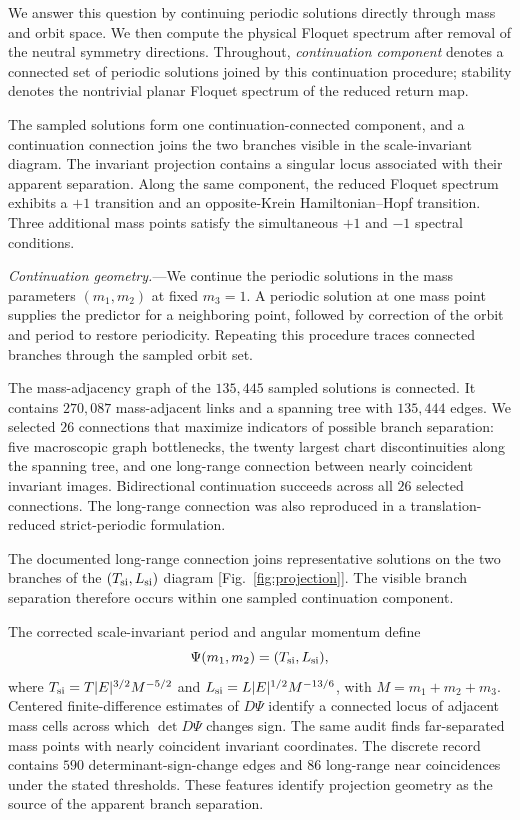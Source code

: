 \documentclass[aps,prl,reprint,amsmath,amssymb]{revtex4-2}
\begin{document}
We answer this question by continuing periodic solutions directly through mass
and orbit space. We then compute the physical Floquet spectrum after removal of
the neutral symmetry directions. Throughout, \emph{continuation component}
denotes a connected set of periodic solutions joined by this continuation
procedure; stability denotes the nontrivial planar Floquet spectrum of the
reduced return map.

The sampled solutions form one continuation-connected component, and a
continuation connection joins the two branches visible in the scale-invariant
diagram. The invariant projection contains a singular locus associated with
their apparent separation. Along the same component, the reduced Floquet
spectrum exhibits a $+1$ transition and an opposite-Krein Hamiltonian--Hopf
transition. Three additional mass points satisfy the simultaneous $+1$ and
$-1$ spectral conditions.



\emph{Continuation geometry.}---We continue the periodic solutions in the mass
parameters $(m_1,m_2)$ at fixed $m_3=1$. A periodic solution at one mass point
supplies the predictor for a neighboring point, followed by correction of the
orbit and period to restore periodicity. Repeating this procedure traces
connected branches through the sampled orbit set.

The mass-adjacency graph of the $135{,}445$ sampled solutions is connected. It
contains $270{,}087$ mass-adjacent links and a spanning tree with $135{,}444$
edges. We selected $26$ connections that maximize indicators of possible
branch separation: five macroscopic graph bottlenecks, the twenty largest chart
discontinuities along the spanning tree, and one long-range connection between
nearly coincident invariant images. Bidirectional continuation succeeds across
all $26$ selected connections. The long-range connection was also reproduced
in a translation-reduced strict-periodic formulation.

The documented long-range connection joins representative solutions on the
two branches of the $(T_{\rm si},L_{\rm si})$ diagram
[Fig.~\ref{fig:projection}]. The visible branch separation therefore occurs
within one sampled continuation component.

The corrected scale-invariant period and angular momentum define
\begin{equation}
\Psi(m_1,m_2)=(T_{\rm si},L_{\rm si}),
\end{equation}
where
$T_{\rm si}=T\lvert E\rvert^{3/2}M^{-5/2}$ and
$L_{\rm si}=L\lvert E\rvert^{1/2}M^{-13/6}$, with
$M=m_1+m_2+m_3$. Centered finite-difference estimates of $D\Psi$ identify a
connected locus of adjacent mass cells across which $\det D\Psi$ changes sign.
The same audit finds far-separated mass points with nearly coincident invariant
coordinates. The discrete record contains $590$ determinant-sign-change edges
and $86$ long-range near coincidences under the stated thresholds. These
features identify projection geometry as the source of the apparent branch
separation.
\end{document}
